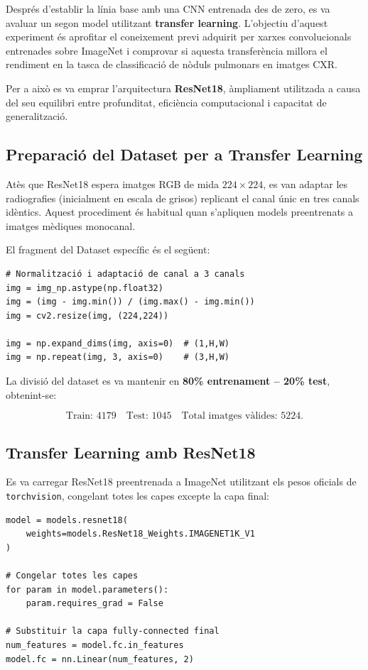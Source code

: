 \documentclass[12pt,a4paper]{article}
\begin{document}
Després d’establir la línia base amb una CNN entrenada des de zero, es va avaluar un segon
model utilitzant \textbf{transfer learning}. L’objectiu d’aquest experiment és
aprofitar el coneixement previ adquirit per xarxes convolucionals entrenades sobre
ImageNet i comprovar si aquesta transferència millora el rendiment en la tasca de
classificació de nòduls pulmonars en imatges CXR.

Per a això es va emprar l’arquitectura \textbf{ResNet18}, àmpliament utilitzada a causa del
seu equilibri entre profunditat, eficiència computacional i capacitat de generalització.

\subsection{Preparació del Dataset per a Transfer Learning}

Atès que ResNet18 espera imatges RGB de mida $224 \times 224$, es van adaptar les
radiografies (inicialment en escala de grisos) replicant el canal únic en tres
canals idèntics. Aquest procediment és habitual quan s’apliquen models
preentrenats a imatges mèdiques monocanal.

El fragment del Dataset específic és el següent:

\begin{lstlisting}[style=mypython]
# Normalització i adaptació de canal a 3 canals
img = img_np.astype(np.float32)
img = (img - img.min()) / (img.max() - img.min())
img = cv2.resize(img, (224,224))

img = np.expand_dims(img, axis=0)  # (1,H,W)
img = np.repeat(img, 3, axis=0)    # (3,H,W)
\end{lstlisting}

La divisió del dataset es va mantenir en \textbf{80\% entrenament – 20\% test},
obtenint-se:

\[
\text{Train: } 4179 \quad
\text{Test: } 1045 \quad
\text{Total imatges vàlides: } 5224.
\]

\subsection{Transfer Learning amb ResNet18}

Es va carregar ResNet18 preentrenada a ImageNet utilitzant els pesos oficials de
\texttt{torchvision}, congelant totes les capes excepte la capa final:

\begin{lstlisting}[style=mypython]
model = models.resnet18(
    weights=models.ResNet18_Weights.IMAGENET1K_V1
)

# Congelar totes les capes
for param in model.parameters():
    param.requires_grad = False

# Substituir la capa fully-connected final
num_features = model.fc.in_features
model.fc = nn.Linear(num_features, 2)
\end{lstlisting}
\end{document}
